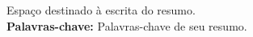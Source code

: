 \begin{resumo}
Espaço destinado à escrita do resumo.\\
\textbf{Palavras-chave:} Palavras-chave de seu resumo.
\end{resumo}